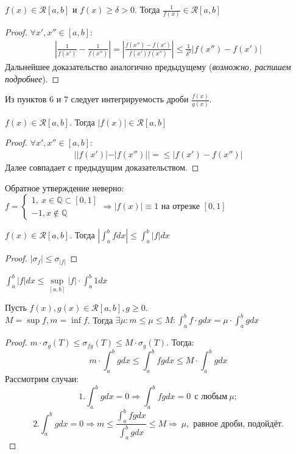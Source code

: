 \begin{numtheorem}
    $f(x) \in \mathcal{R}[a, b]$ и $f(x) \geq \delta > 0$. Тогда $\frac{1}{f(x)} \in \mathcal{R}[a, b]$
\end{numtheorem}
\begin{proof}
    $\forall x', x'' \in [a, b]$:
    \begin{align*}
        |\frac{1}{f(x')} - \frac{1}{f(x'')}| = |\frac{f(x'') - f(x')}{f(x')f(x'')}| \leq \frac{1}{\delta^2}|f(x'')-f(x')|
    \end{align*}
    Дальнейшее доказательство аналогично предыдущему (\textit{возможно, распишем подробнее}).
\end{proof}
\begin{comm}
    Из пунктов 6 и 7 следует интегрируемость дроби $\frac{f(x)}{g(x)}$.
\end{comm}
\begin{numtheorem}
    $f(x) \in \mathcal{R}[a, b]$. Тогда $|f(x)| \in \mathcal{R}[a, b]$
\end{numtheorem}
\begin{proof}
    $\forall x', x'' \in [a, b]$:
    \begin{align*}
        ||f(x')| - |f(x'')|| = \leq |f(x')-f(x'')|
    \end{align*}
    Далее совпадает с предыдущим доказательством.
\end{proof}
\begin{comm}
    Обратное утверждение неверно:\\
    $f = \begin{cases}
        1, \ x\in\mathbb{Q}\subset [0, 1]\\
        -1, x\notin\mathbb{Q}
    \end{cases} \Rightarrow |f(x)| \equiv 1$ на отрезке $[0, 1]$
\end{comm}
\begin{numtheorem}
    $f(x) \in \mathcal{R}[a, b]$. Тогда $|\int_{a}^{b}f dx|\leq \int_{a}^{b}|f| dx$
\end{numtheorem}
\begin{proof}
    $|\sigma_f| \leq \sigma_{|f|}$
\end{proof}
\begin{comm}
    $\int_{a}^{b}|f| dx \leq \sup \limits_{[a, b]} |f|\cdot\int_{a}^{b}1 dx$
\end{comm}
\setcounter{thmcount}{0}
\begin{theorem}
    Пусть $f(x), g(x) \in \mathcal{R}[a, b], g \geq 0$.\\
    $M = \sup f, m = \inf f$. Тогда $\exists \mu: m\leq\mu\leq M: \int_{a}^{b}f\cdot g dx = \mu\cdot\int_{a}^{b}g dx$
\end{theorem}
\begin{proof}
    $m\cdot \sigma_g(T) \leq \sigma_{fg}(T) \leq M\cdot\sigma_g(T)$. Тогда:
    \[m\cdot \int_{a}^{b} g dx \leq \int_{a}^{b} fg dx \leq M\cdot\int_{a}^{b} g dx\]
    Рассмотрим случаи:
    \[1. \int_{a}^{b} g dx = 0 \Rightarrow \int_{a}^{b} fg dx = 0 \ \ \text{с любым} \ \mu;\]
    \[2. \int_{a}^{b} g dx = 0 \Rightarrow m\leq \frac{\int_{a}^{b} fg dx}{\int_{a}^{b} g dx}\leq M \Rightarrow \ \mu, \text{ равное дроби, подойдёт.}\]
\end{proof}
